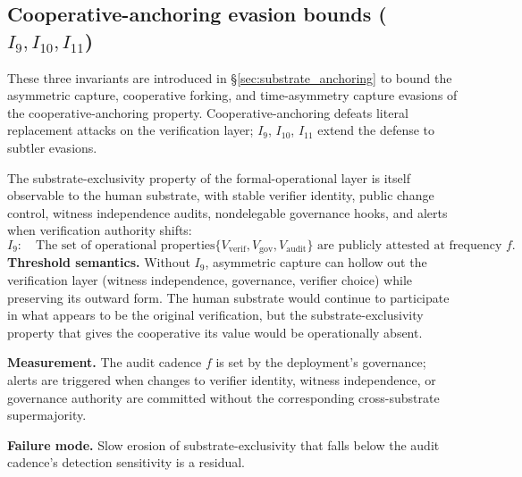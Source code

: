\subsection{Cooperative-anchoring evasion bounds (\texorpdfstring{$I_9, I_{10}, I_{11}$}{I9, I10, I11})}
\label{sec:anchoring_invariants}

These three invariants are introduced in
\S\ref{sec:substrate_anchoring} to bound the asymmetric capture,
cooperative forking, and time-asymmetry capture evasions of the
cooperative-anchoring property. Cooperative-anchoring defeats
literal replacement attacks on the verification layer; $I_9$,
$I_{10}$, $I_{11}$ extend the defense to subtler evasions.

\begin{definition}
\label{inv:I9}
The substrate-exclusivity property of the formal-operational layer
is itself observable to the human substrate, with stable verifier
identity, public change control, witness independence audits,
nondelegable governance hooks, and alerts when verification
authority shifts:
\[
  I_9: \quad \text{The set of operational properties}
  \{V_{\mathrm{verif}}, V_{\mathrm{gov}}, V_{\mathrm{audit}}\}
  \text{ are publicly attested at frequency } f.
\]
\textbf{Threshold semantics.} Without $I_9$, asymmetric capture can hollow out
    the verification layer (witness independence, governance, verifier choice)
    while preserving its outward form. The human substrate would continue to
    participate in what appears to be the original verification, but the
    substrate-exclusivity property that gives the cooperative its value would
    be operationally absent.

\textbf{Measurement.} The audit cadence $f$ is set by the deployment's
    governance; alerts are triggered when changes to verifier identity, witness
    independence, or governance authority are committed without the
    corresponding cross-substrate supermajority.

\textbf{Failure mode.} Slow erosion of substrate-exclusivity that falls below
    the audit cadence's detection sensitivity is a residual.
\end{definition}

